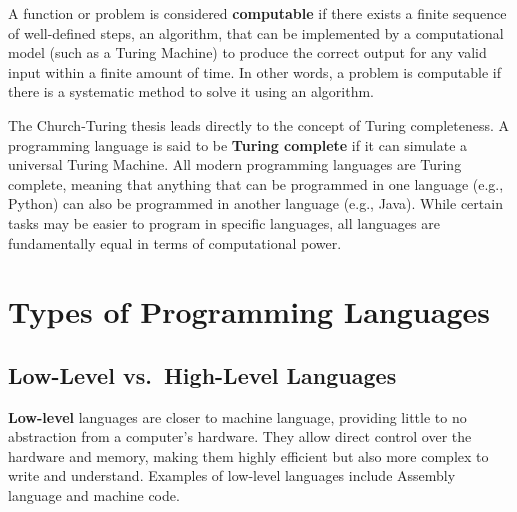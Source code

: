 \documentclass[
  letterpaper,
  DIV=11,
  numbers=noendperiod]{scrreprt}
\begin{document}
\begin{tcolorbox}[enhanced jigsaw, coltitle=black, colback=white, bottomrule=.15mm, arc=.35mm, titlerule=0mm, opacitybacktitle=0.6, toptitle=1mm, left=2mm, toprule=.15mm, opacityback=0, bottomtitle=1mm, title=\textcolor{quarto-callout-note-color}{\faInfo}\hspace{0.5em}{Note}, rightrule=.15mm, colframe=quarto-callout-note-color-frame, breakable, colbacktitle=quarto-callout-note-color!10!white, leftrule=.75mm]

A function or problem is considered \textbf{computable} if there exists
a finite sequence of well-defined steps, an algorithm, that can be
implemented by a computational model (such as a Turing Machine) to
produce the correct output for any valid input within a finite amount of
time. In other words, a problem is computable if there is a systematic
method to solve it using an algorithm.

\end{tcolorbox}

The Church-Turing thesis leads directly to the concept of Turing
completeness. A programming language is said to be \textbf{Turing
complete} if it can simulate a universal Turing Machine. All modern
programming languages are Turing complete, meaning that anything that
can be programmed in one language (e.g., Python) can also be programmed
in another language (e.g., Java). While certain tasks may be easier to
program in specific languages, all languages are fundamentally equal in
terms of computational power.

\hypertarget{types-of-programming-languages}{%
\section{Types of Programming
Languages}\label{types-of-programming-languages}}

\hypertarget{low-level-vs.-high-level-languages}{%
\subsection{Low-Level vs.~High-Level
Languages}\label{low-level-vs.-high-level-languages}}

\textbf{Low-level} languages are closer to machine language, providing
little to no abstraction from a computer's hardware. They allow direct
control over the hardware and memory, making them highly efficient but
also more complex to write and understand. Examples of low-level
languages include Assembly language and machine code.
\end{document}
